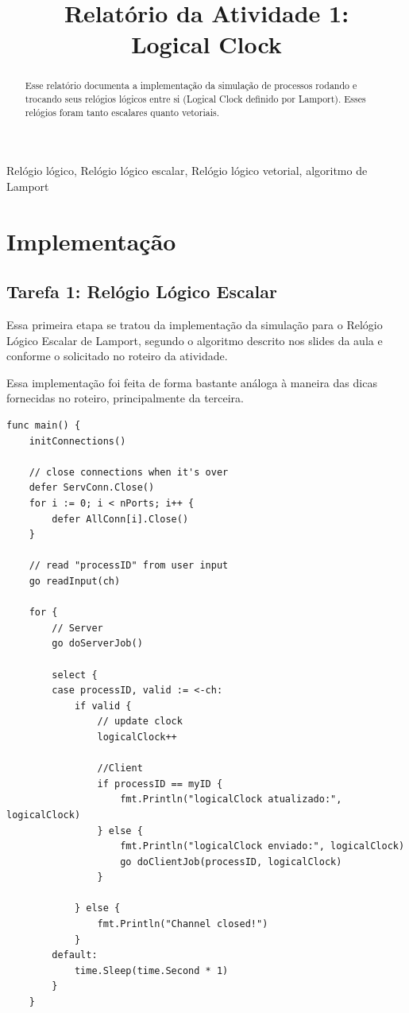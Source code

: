 \documentclass[conference]{IEEEtran}
\begin{document}
\title{Relatório da Atividade 1: \\ Logical Clock\\
}

\author{
}

\maketitle

\begin{abstract}
Esse relatório documenta a implementação da simulação de processos rodando e trocando seus relógios lógicos entre si (Logical Clock definido por Lamport). Esses relógios foram tanto escalares quanto vetoriais.
\end{abstract}

\begin{IEEEkeywords}
Relógio lógico, Relógio lógico escalar, Relógio lógico vetorial, algoritmo de Lamport
\end{IEEEkeywords}

\section{Implementação}

	\subsection{Tarefa 1: Relógio Lógico Escalar}
	
	Essa primeira etapa se tratou da implementação da simulação para o Relógio Lógico Escalar de Lamport, segundo o algoritmo descrito nos slides da aula e conforme o solicitado no roteiro da atividade.
	
	Essa implementação foi feita de forma bastante análoga à maneira das dicas fornecidas no roteiro, principalmente da terceira.
	
\begin{lstlisting}
func main() {
	initConnections()

	// close connections when it's over
	defer ServConn.Close()
	for i := 0; i < nPorts; i++ {
		defer AllConn[i].Close()
	}

	// read "processID" from user input
	go readInput(ch)

	for {
		// Server
		go doServerJob()
		
		select {
		case processID, valid := <-ch:
			if valid {
				// update clock
				logicalClock++
				
				//Client
				if processID == myID {
					fmt.Println("logicalClock atualizado:", logicalClock)
				} else {
					fmt.Println("logicalClock enviado:", logicalClock)
					go doClientJob(processID, logicalClock)
				}

			} else {
				fmt.Println("Channel closed!")
			}
		default:
			time.Sleep(time.Second * 1)
		}
	}
\end{lstlisting}
\end{document}
